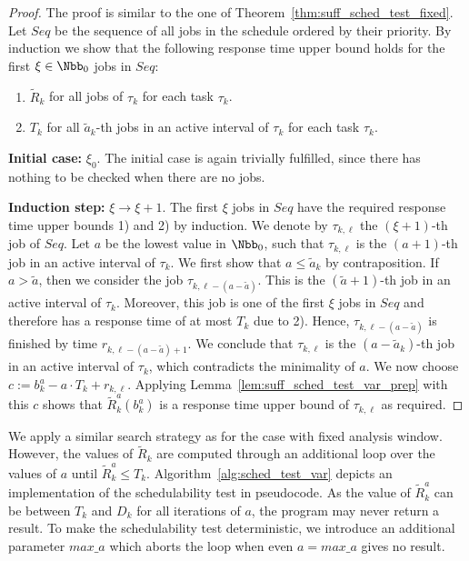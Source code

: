 \documentclass[conference]{IEEEtran}
\theoremstyle{definition}
\theoremstyle{remark}
\newcommand{\Rtilde}{\widetilde{R}}
\begin{document}
	\begin{proof}
		The proof is similar to the one of Theorem~\ref{thm:suff_sched_test_fixed}.
		Let $Seq$ be the sequence of all jobs in the schedule ordered by their priority.
		By induction we show that the following response time upper bound holds for the first $\xi \in \Nbb_0$ jobs in $Seq$:
		\begin{enumerate}
			\item $\Rtilde_k$ for all jobs of $\tau_k$ for each task $\tau_k$.
			\item $T_k$ for all $\tilde a_k$-th jobs in an active interval of $\tau_k$ for each task $\tau_k$.
		\end{enumerate}
		
		\textbf{Initial case:} $\xi_0$. The initial case is again trivially fulfilled, since there has nothing to be checked when there are no jobs.
		
		\textbf{Induction step:} $\xi \to \xi+1$.
		The first $\xi$ jobs in $Seq$ have the required response time upper bounds 1) and 2) by induction.
		We denote by $\tau_{k,\ell}$ the $(\xi+1)$-th job of $Seq$.
		Let $a$ be the lowest value in $\Nbb_0$, such that $\tau_{k,\ell}$ is the $(a+1)$-th job in an active interval of $\tau_k$.
		We first show that $a\leq \tilde a_k$ by contraposition.
		If $a > \tilde a$, then we consider the job $\tau_{k,\ell-(a-\tilde a)}$.
		This is the $(\tilde a+1)$-th job in an active interval of $\tau_k$.
		Moreover, this job is one of the first $\xi$ jobs in $Seq$ and therefore has a response time of at most $T_k$ due to 2).
		Hence, $\tau_{k,\ell-(a-\tilde a)}$ is finished by time $r_{k,\ell-(a-\tilde a)+1}$.
		We conclude that $\tau_{k,\ell}$ is the $(a-\tilde a_k)$-th job in an active interval of $\tau_k$, which contradicts the minimality of $a$.
		We now choose $c:=b^a_k-a\cdot T_k + r_{k,\ell}$.
		Applying Lemma~\ref{lem:suff_sched_test_var_prep} with this $c$ shows that $\Rtilde^a_k(b^a_k)$ is a response time upper bound of $\tau_{k,\ell}$ as required.
	\end{proof}

We apply a similar search strategy as for the case with fixed analysis window. 
However, the values of $\Rtilde_k$ are computed through an additional loop over the values of $a$ until $\Rtilde^a_k \leq T_k$.
Algorithm~\ref{alg:sched_test_var} depicts an implementation of the schedulability test in pseudocode.
As the value of $\Rtilde^a_k$ can be between $T_k$ and $D_k$ for all iterations of $a$, the program may never return a result. 
To make the schedulability test deterministic, we introduce an additional parameter $max\_a$ which aborts the loop when even $a=max\_a$ gives no result.
\end{document}
